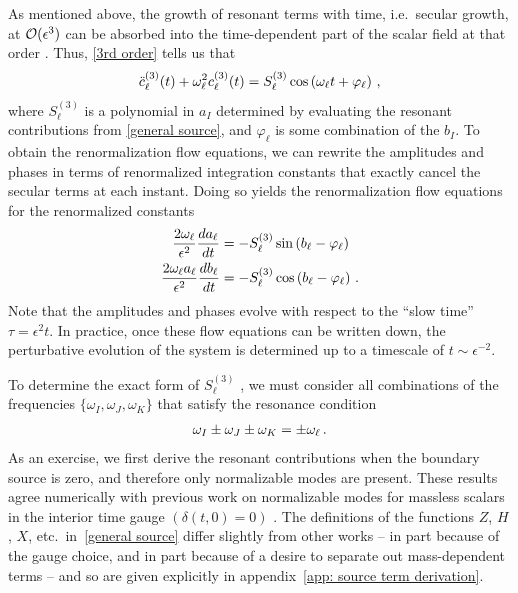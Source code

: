 \documentclass[../PhD.tex]{subfiles}
\begin{document}
As mentioned above, the growth of resonant terms with time, i.e.~secular growth, at $\mathcal O(\epsilon^3)$ can be absorbed into the time-dependent part of the scalar field at that order \cite{hep-th/9506161}. Thus, \eqref{3rd order} tells us that
\begin{align}
\ddot c^{(3)}_\ell (t) + \omega_\ell^2 c^{(3)}_\ell(t) = S^{(3)}_\ell \cos \left( \omega_\ell t + \varphi_\ell \right) \, ,
\end{align}
where $S^{(3)}_\ell$ is a polynomial in $a_I$ determined by evaluating the resonant contributions from \eqref{general source}, and $\varphi_\ell$ is some combination of the $b_I$. To obtain the renormalization flow equations, we can rewrite the amplitudes and phases in terms of renormalized integration constants that exactly cancel the secular terms at each instant. Doing so yields the renormalization flow equations for the renormalized constants~\cite{1407.6273}
\begin{align}
\label{RN flow 1}
\frac{2 \omega_\ell}{\epsilon^2} \frac{d a_\ell}{d t} &= - S^{(3)}_\ell \sin \left( b_\ell - \varphi_\ell \right) \\
\label{RN flow 2}
\frac{2 \omega_\ell a_\ell}{\epsilon^2} \frac{d b_\ell}{d t} &= - S^{(3)}_\ell \cos \left( b_\ell - \varphi_\ell \right) \, .
\end{align}
Note that the amplitudes and phases evolve with respect to the ``slow time'' $\tau = \epsilon^2 t$. In practice, once these flow equations can be written down, the perturbative evolution of the system is determined up to a timescale of $t \sim \epsilon^{-2}$.

To determine the exact form of $S^{(3)}_\ell\!\!\!$ , we must consider all combinations of the frequencies ${\{ \omega_I, \omega_J, \omega_K\}}$ that satisfy the resonance condition
\begin{align}
\label{gen res}
\omega_I \pm \omega_J \pm \omega_K = \pm \omega_\ell \, .
\end{align}
As an exercise, we first derive the resonant contributions when the boundary source is zero, and therefore only normalizable modes are present. These results agree numerically with previous work on normalizable modes for massless scalars in the interior time gauge ${(\delta(t, 0) = 0)}$ \cite{1810.04753}. The definitions of the functions $Z$, $H$, $X$, etc.~in~\eqref{general source} differ slightly from other works -- in part because of the gauge choice, and in part because of a desire to separate out mass-dependent terms -- and so are given explicitly in appendix~\ref{app: source term derivation}.
\end{document}
